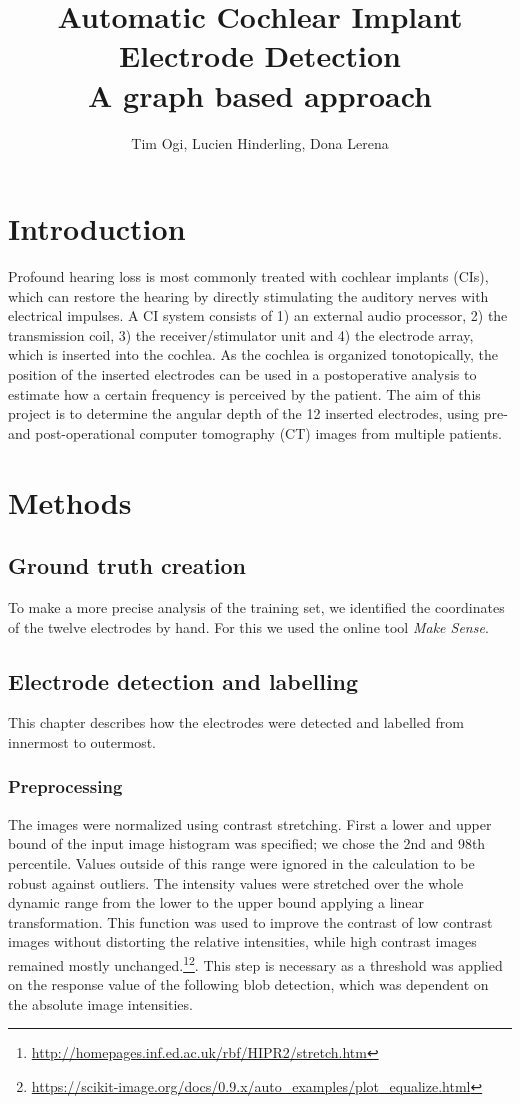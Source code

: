 \documentclass[a4paper, 10pt, twocolumn]{article}
\title{\textbf{Automatic Cochlear Implant Electrode Detection}\\ A graph based approach}
\author{Tim Ogi, Lucien Hinderling, Dona Lerena}
\begin{document}
\maketitle
\section{Introduction}
Profound hearing loss is most commonly treated with cochlear implants (CIs), which can restore the hearing by directly stimulating the auditory nerves with electrical impulses. A CI system consists of 1) an external audio processor, 2) the transmission coil, 3) the receiver/stimulator unit and 4) the electrode array, which is inserted into the cochlea. As the cochlea is organized tonotopically, the position of the inserted electrodes can be used in a postoperative analysis to estimate how a certain frequency is perceived by the patient. The aim of this project is to determine the angular depth of the 12 inserted electrodes, using pre- and post-operational computer tomography (CT) images from multiple patients.
\section{Methods}
\subsection{Ground truth creation}
To make a more precise analysis of the training set, we identified the coordinates of the twelve electrodes by hand. For this we used the online tool  \emph{Make Sense}\cite{makesense}. 
\subsection{Electrode detection and labelling}
This chapter describes how the electrodes were detected and labelled from innermost to outermost.
\subsubsection{Preprocessing}
The images were normalized using contrast stretching. First a lower and upper bound of the input image histogram was specified; we chose the 2nd and 98th percentile. Values outside of this range were ignored in the calculation to be robust against outliers. The intensity values were stretched over the whole dynamic range from the lower to the upper bound applying a linear transformation. This function was used to improve the contrast of low contrast images without distorting the relative intensities, while high contrast images remained mostly unchanged.\footnote{\url{http://homepages.inf.ed.ac.uk/rbf/HIPR2/stretch.htm}}\footnote{\url{https://scikit-image.org/docs/0.9.x/auto_examples/plot_equalize.html}}. This step is necessary as a threshold was applied on the response value of the following blob detection, which was dependent on the absolute image intensities.
\end{document}

